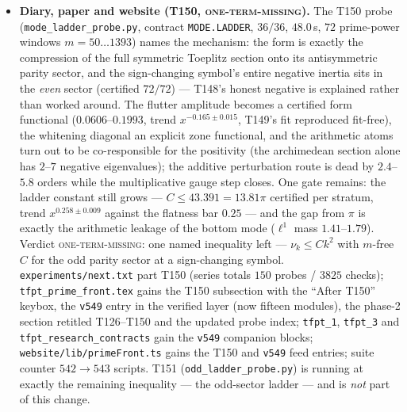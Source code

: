 \documentclass[11pt]{article}
\providecommand{\mE}{\textbf{[E]}}\providecommand{\mC}{\textbf{[C]}}
\begin{document}
\begin{itemize}[leftmargin=1.5em]
$D$; $\mathrm{TV}(\log\Lambda)$ stays withdrawn as a hypothesis (T149),
$\sigma_{\mathrm{tot}}$ stays retired as a route (T148); every T149/T150 exponent is a fit that
stays in the sandbox. Kac--Murdock--Szeg\H{o} 1953 (in the parity sector), Widom 1958 /
Basor--Ehrhardt 2009 / B\"ottcher--Silbermann (the parity sectors as the algebra's natural
objects --- the address, never an authority; the sign-changing symbol is exactly what
Basor--Ehrhardt does \emph{not} cover, and that gap is the open input), Sylvester 1852 /
Bunch--Kaufman 1977, Chebyshev 1852 (verified on the table), Abel, Weyl 1912 / Bauer--Fike 1960
/ Davis--Kahan 1970 (cited, computed dead, \emph{not} used), Rayleigh 1877 / Ritz 1909,
Cauchy--Schwarz, Gershgorin 1931, Wilkinson 1968 / Higham 2002 named classical; Weil 1952
cited, never used as a criterion; zero-firewall AST-checked. Ledger row
\texttt{PRIME.GAUGE.PARITY.IDENT.01} \mE; \textbf{no marker of any pre-existing contract
moves}, and this is not RH evidence.
\item \textbf{Diary, paper and website (T150, \textsc{one-term-missing}).} The T150 probe
(\texttt{mode\_\allowbreak ladder\_\allowbreak probe.py}, contract \texttt{MODE.LADDER},
$36/36$, $48.0$\,s, $72$ prime-power windows $m=50\ldots1393$) names the mechanism: the form is
exactly the compression of the full symmetric Toeplitz section onto its antisymmetric parity
sector, and the sign-changing symbol's entire negative inertia sits in the \emph{even} sector
(certified $72/72$) --- T148's honest negative is explained rather than worked around. The
flutter amplitude becomes a certified form functional ($0.0606$--$0.1993$, trend
$x^{-0.165\pm0.015}$, T149's fit reproduced fit-free), the whitening diagonal an explicit zone
functional, and the arithmetic atoms turn out to be co-responsible for the positivity (the
archimedean section alone has $2$--$7$ negative eigenvalues); the additive perturbation route
is dead by $2.4$--$5.8$ orders while the multiplicative gauge step closes. One gate remains:
the ladder constant still grows --- $C\le43.391=13.81\pi$ certified per stratum, trend
$x^{0.258\pm0.009}$ against the flatness bar $0.25$ --- and the gap from $\pi$ is exactly the
arithmetic leakage of the bottom mode ($\ell^1$ mass $1.41$--$1.79$). Verdict
\textsc{one-term-missing}: one named inequality left --- $\nu_k\le Ck^2$ with $m$-free $C$ for
the odd parity sector at a sign-changing symbol.
\texttt{experiments/next.txt} part T150 (series totals $150$ probes / $3825$ checks);
\texttt{tfpt\_prime\_front.tex} gains the T150 subsection with the ``After T150'' keybox, the
\texttt{v549} entry in the verified layer (now fifteen modules), the phase-2 section retitled
T126--T150 and the updated probe index; \texttt{tfpt\_1}, \texttt{tfpt\_3} and
\texttt{tfpt\_research\_contracts} gain the \texttt{v549} companion blocks;
\texttt{website/lib/primeFront.ts} gains the T150 and \texttt{v549} feed entries; suite counter
$542\to543$ scripts. T151 (\texttt{odd\_ladder\_probe.py}) is running at exactly the remaining
inequality --- the odd-sector ladder --- and is \emph{not} part of this change.
\end{itemize}
\end{document}
